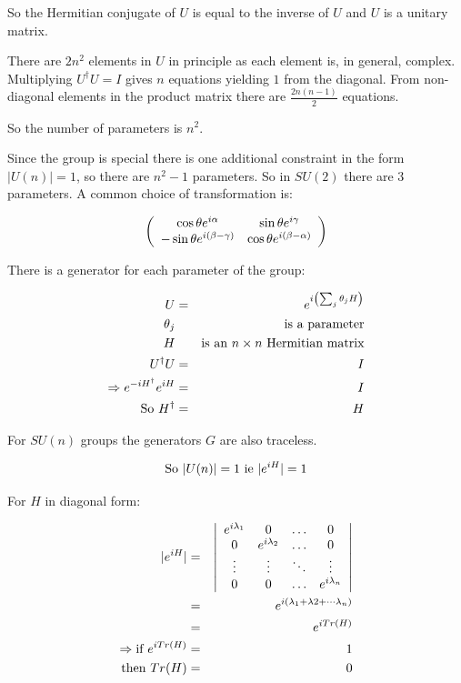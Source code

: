 So the Hermitian conjugate of $U$ is equal to the inverse of $U$ and $U$ is a unitary matrix.

There are $2n^2$ elements in $U$ in principle as each element is, in general, complex.  Multiplying $U^{\dagger}U = I$ gives $n$ equations yielding $1$ from the diagonal.  From non-diagonal elements in the product matrix there are $\frac{2n(n-1)}{2}$ equations.

So the number of parameters is $n^2$.

Since the group is special there is one additional constraint in the form $|U(n)| = 1$, so there are $n^2-1$ parameters.  So in $SU(2)$ there are $3$ parameters.  A common choice of transformation is:

\[
  \left(
  \begin{array}{cc}
    \cos\theta e^{i\alpha} & \sin\theta e^{i\gamma} \\
    -\sin\theta e^{i(\beta - \gamma)} & \cos\theta e^{i(\beta - \alpha)}
  \end{array}
  \right)
\]

There is a generator for each parameter of the group:

\begin{eqnarray*}
  U & = & e^{i\left(\sum_j \theta_j H\right)} \\
  \theta_j & & \textrm{is a parameter} \\
  H & & \textrm{is an }n\times n\textrm{ Hermitian matrix} \\
  U^{\dagger}U & = & I \\
  \Rightarrow e^{-iH^{\dagger}}e^{iH} & = & I \\
  \textrm{So } H^{\dagger} & = & H
\end{eqnarray*}

For $SU(n)$ groups the generators $G$ are also traceless.

\[
  \textrm{So } |U(n)| = 1 \textrm{ ie } |e^{iH}| = 1
\]

For $H$ in diagonal form:

\begin{eqnarray*}
  |e^{iH}| & =&  \left|
  \begin{array}{cccc}
  e^{i\lambda_1} & 0 & \ldots & 0 \\
  0 & e^{i\lambda_2} & \ldots & 0 \\
  \vdots & \vdots & \ddots & \vdots \\
  0 & 0 & \ldots & e^{i\lambda_n}
  \end{array}
  \right| \\
  & = & e^{i(\lambda_1 + \lambda2 + \cdots \lambda_n)} \\
  & = & e^{iTr(H)} \\
  \Rightarrow \textrm{if } e^{iTr(H)} & = & 1 \\
  \textrm{then } Tr(H) & = & 0
\end{eqnarray*}

